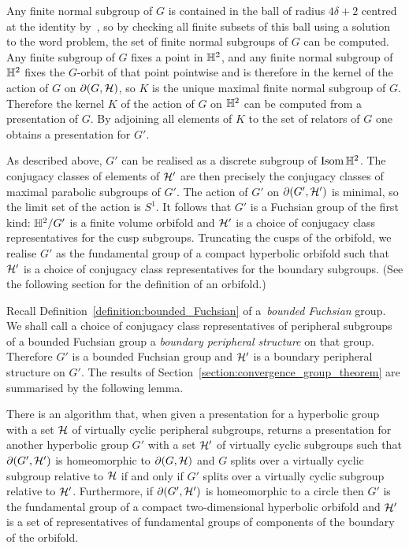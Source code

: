Any finite normal subgroup of $G$ is contained in the ball of radius $4\delta + 2$ centred at the identity by~\cite[Theorem 3.2]{bridsonhaefliger99}, so by checking all finite subsets of this ball using a solution to the word problem, the set of finite normal subgroups of $G$ can be computed. 
Any finite subgroup of $G$ fixes a point in $\mathbb{H}^2$, and any finite normal subgroup of $\mathbb{H}^2$ fixes the $G$-orbit of that point pointwise and is therefore in the kernel of the action of $G$ on $\partial(G,\mathcal{H})$, so $K$ is the unique maximal finite normal subgroup of $G$.
Therefore the kernel $K$ of the action of $G$ on $\mathbb{H}^2$ can be computed from a presentation of $G$.
By adjoining all elements of $K$ to the set of relators of $G$ one obtains a presentation for $G'$.

As described above, $G'$ can be realised as a discrete subgroup of $\operatorname{\mathrm{Isom}}\mathbb{H}^2$. 
The conjugacy classes of elements of $\mathcal{H}'$ are then precisely the conjugacy classes of maximal parabolic subgroups of $G'$. 
The action of $G'$ on $\partial(G', \mathcal{H}')$ is minimal, so the limit set of the action is $S^1$. 
It follows that $G'$ is a Fuchsian group of the first kind: $\mathbb{H}^2/G'$ is a finite volume orbifold and $\mathcal{H}'$ is a choice of conjugacy class representatives for the cusp subgroups. 
Truncating the cusps of the orbifold, we realise $G'$ as the fundamental group of a compact hyperbolic orbifold such that $\mathcal{H}'$ is a choice of conjugacy class representatives for the boundary subgroups. 
(See the following section for the definition of an orbifold.)

Recall Definition~\ref{definition:bounded_Fuchsian} of a~\emph{bounded Fuchsian} group.
We shall call a choice of conjugacy class representatives of peripheral subgroups of a bounded Fuchsian group a \emph{boundary peripheral structure} on that group.
Therefore $G'$ is a bounded Fuchsian group and $\mathcal{H}'$ is a boundary peripheral structure on $G'$.
The results of Section~\ref{section:convergence_group_theorem} are summarised by the following lemma.

\begin{lemma}\label{lemma:group_to_orbifold} There is an algorithm that, when given a
presentation for a hyperbolic group with a set $\mathcal{H}$ of virtually
cyclic peripheral subgroups, returns a presentation for another hyperbolic
group $G'$ with a set $\mathcal{H}'$ of virtually cyclic subgroups such
that $\partial(G', \mathcal{H}')$ is homeomorphic to $\partial(G,
\mathcal{H})$ and $G$ splits over a virtually cyclic subgroup relative
to $\mathcal{H}$ if and only if $G'$ splits over a virtually cyclic
subgroup relative to $\mathcal{H}'$. Furthermore, if $\partial(G',
\mathcal{H}')$ is homeomorphic to a circle then $G'$ is the fundamental
group of a compact two-dimensional hyperbolic orbifold and $\mathcal{H}'$ is
a set of representatives of fundamental groups of components of the boundary of
the orbifold. \end{lemma}

